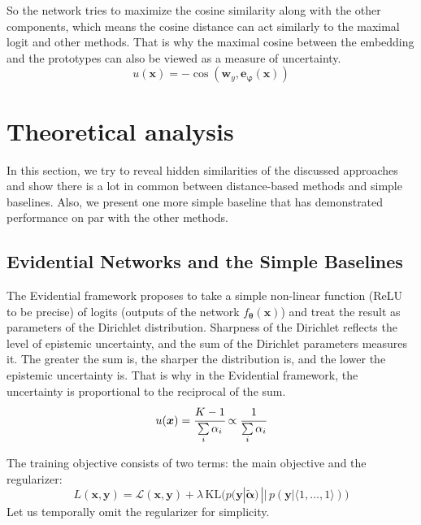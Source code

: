 \documentclass{article}
\begin{document}
So the network tries to maximize the cosine similarity along with the other components, which means the cosine distance can act similarly to the maximal logit and other methods.
That is why the maximal cosine between the embedding and the prototypes can also be viewed as a measure of uncertainty.
\begin{equation}
u(\boldsymbol{x}) = -\cos(\boldsymbol{w}_y, \boldsymbol{e}_{\boldsymbol{\varphi}}(\boldsymbol{x}))
\end{equation}

\section{Theoretical analysis}
\label{section:analysis}
In this section, we try to reveal hidden similarities of the discussed approaches and show there is a lot in common between distance-based methods and simple baselines. Also, we present one more simple baseline that has demonstrated performance on par with the other methods.

\subsection{Evidential Networks and the Simple Baselines}
The Evidential framework proposes to take a simple non-linear function (ReLU to be precise) of logits (outputs of the network $f_{\boldsymbol{\theta}}(\boldsymbol{x})$) and treat the result as parameters of the Dirichlet distribution. Sharpness of the Dirichlet reflects the level of epistemic uncertainty, and the sum of the Dirichlet parameters measures it. The greater the sum is, the sharper the distribution is, and the lower the epistemic uncertainty is. That is why in the Evidential framework, the uncertainty is proportional to the reciprocal of the sum.
\begin{equation}
u(\boldsymbol{x}) = \cfrac{K - 1}{\sum\limits_i \alpha_i} \propto \cfrac{1}{\sum\limits_i \alpha_i}
\end{equation}

The training objective consists of two terms: the main objective and the regularizer:
\begin{equation}
L(\boldsymbol{x}, \boldsymbol{y}) = \mathcal{L}(\boldsymbol{x}, \boldsymbol{y}) + \lambda \, \mathrm{KL} \Big( p(\boldsymbol{y} | \tilde{\boldsymbol{\alpha}}) \, || \, p(\boldsymbol{y} | \langle 1, \dots, 1 \rangle) \Big)
\end{equation}
Let us temporally omit the regularizer for simplicity.
\end{document}
